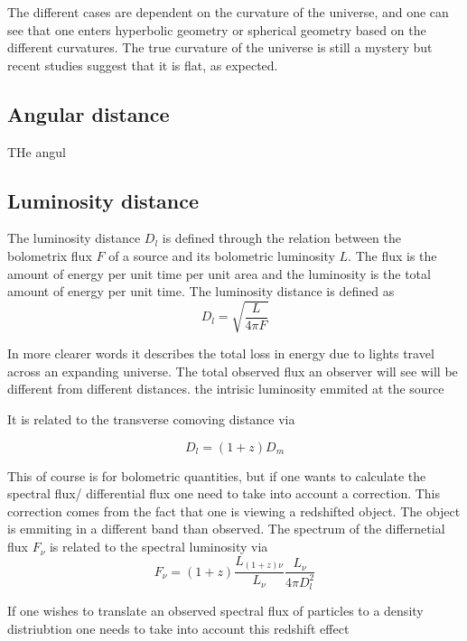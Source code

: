 \documentclass{article}
\begin{document}
The different cases are dependent on the curvature of the universe, and one can see that one enters hyperbolic geometry or spherical geometry based on the different curvatures. The true curvature of the universe is still a mystery but recent studies suggest that it is flat, as expected. 


\subsection{Angular distance}


THe angul


\subsection{Luminosity distance}
The luminosity distance $D_l$ is defined through the relation between 
the bolometrix flux $F$ of a source and its bolometric luminosity $L$. 
The flux is the amount of energy per unit time per unit area and the luminosity is the total amount of energy per unit time. 
The luminosity distance is defined as
\begin{equation}
    D_l = \sqrt{\frac{L}{4\pi F}}
\end{equation}

In more clearer words it describes the total loss in energy due to lights travel across an expanding universe. 
The total observed flux an observer will see will be different from different distances.  the intrisic luminosity emmited at the source


It is related to the transverse comoving distance via 

\begin{equation}
    D_l = (1+z)D_m
\end{equation}

This of course is for bolometric quantities, but if one wants to calculate the spectral 
flux/ differential flux one need to take into account a correction. This correction comes 
from the fact that one is viewing a redshifted object. The object is emmiting in a different band than 
observed. The spectrum of the differnetial flux $F_\nu$ is related to the spectral luminosity via
\begin{equation}
    F_\nu = (1+z) \frac{L_{(1+z)\nu}}{L_\nu}\frac{L_\nu}{4\pi D_l^2}
\end{equation}

If one wishes to translate an observed spectral flux of particles to a density distriubtion one needs to take into account this redshift effect
\end{document}
